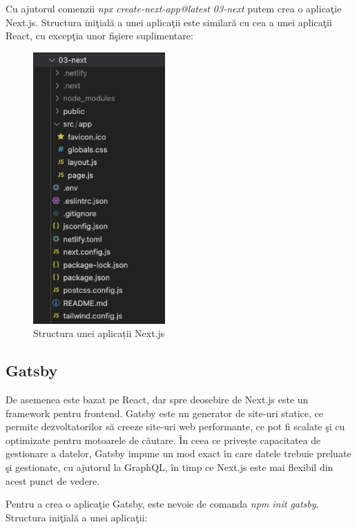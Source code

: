 \documentclass[12pt, a4paper]{report}
\begin{document}
Cu ajutorul comenzii \textit{npx create-next-app@latest 03-next} putem crea o aplica\c tie Next.js. Structura ini\c tial\u a a unei aplica\c tii este similar\u a cu cea a unei aplica\c tii React, cu excep\c tia unor fi\c siere suplimentare:
\begin{figure}[htbp]
	\centering
	\includegraphics[width=0.45\textwidth]{next_file_structure.png}
	\caption{Structura unei aplicații Next.js}
	\label{fig:next-structure}
\end{figure}


\subsection{Gatsby}
De asemenea este bazat pe React, dar spre deosebire de Next.js este un framework pentru frontend. Gatsby este un generator de site-uri statice, ce permite dezvoltatorilor să creeze site-uri web performante, ce pot fi scalate \c si cu optimizate pentru motoarele de c\u autare. În ceea ce privește capacitatea de gestionare a datelor, Gatsby impune un mod exact în care datele trebuie preluate \c si gestionate, cu ajutorul la GraphQL, în timp ce Next.js este mai flexibil din acest punct de vedere.

Pentru a crea o aplica\c tie Gatsby, este nevoie de comanda \textit{npm init gatsby}. Structura ini\c tial\u a a unei aplica\c tii:
\end{document}
